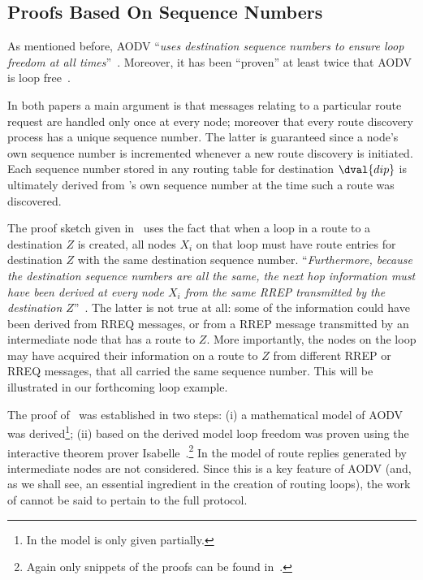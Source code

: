 \documentclass[letterpaper]{sig-alternate-pages}
\renewcommand{\sf}{\it}
\begin{document}
\subsection{Proofs Based On Sequence Numbers}\label{ssec:sqns}

As mentioned
before, AODV ``{\sf  uses destination sequence numbers to ensure loop freedom at all times\/}''~\cite[Page~2]{rfc3561}.
Moreover, it has been ``proven'' at least twice that AODV is loop free~\cite{AODV99,ZYZW09}. 

In both papers a main argument is that messages relating to a particular route request are handled only once at every node; 
moreover that every route discovery process has a unique sequence number. 
The latter is guaranteed since a node's own sequence number is incremented whenever a new route discovery is initiated.
Each sequence number stored in any routing table for destination $\dval{dip}$ is ultimately derived from
's own sequence number at the time such a route was discovered.

The proof sketch given in~\cite{AODV99} uses the fact that when a loop in a route to a destination
$Z$ is created, all nodes $X_i$ on that loop must have route entries for destination $Z$
with the same destination sequence number. ``{\sl Furthermore, because the destination sequence
numbers are all the same, the next hop information must have been derived at every node
$X_i$ from the same RREP transmitted by the destination $Z$\/}''~\cite[Page 11]{AODV99}. The latter is not true at all:
some of the information could have been derived from RREQ messages, or from a RREP message transmitted
by an intermediate node that has a route to $Z$. More importantly, the nodes on the loop
may have acquired their information on a route to $Z$ from different RREP or RREQ
messages, that all carried the same sequence number. This will be illustrated in our
forthcoming loop example.

The proof of~\cite{ZYZW09} was established in two steps: 
(i) a mathematical model of AODV was derived\footnote{In \cite{ZYZW09} the model is only given partially.};
(ii) based on the derived model loop freedom was proven using the interactive theorem prover Isabelle~\cite{NipkowPaulsonWenzel02}.\footnote{Again only snippets of the proofs can be found in~\cite{ZYZW09}.} 
In the model of \cite{ZYZW09} route replies generated by
  intermediate nodes \cite[Sect.\ 6.6.2.]{rfc3561} are not
  considered. Since this is a key feature of AODV (and, as we shall
  see, an essential ingredient in the creation of routing loops), the
  work of \cite{ZYZW09} cannot be said to pertain to the full protocol.
  
\end{document}
